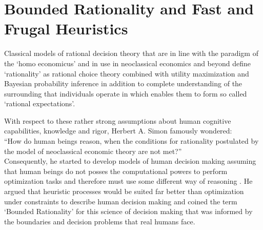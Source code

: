 \section{Bounded Rationality and Fast and Frugal Heuristics}
\label{sec:intro_bounded_rationality} 
Classical models of rational decision theory that are in line with the paradigm of the `homo economicus' and in use in neoclassical economics and beyond define `rationality' as rational choice theory combined with utility maximization and Bayesian probability inference \citep{wilkinson2012introduction} in addition to complete understanding of the surrounding that individuals operate in which enables them to form so called `rational expectations'. 

With respect to these rather strong assumptions about human cognitive capabilities, knowledge and rigor, Herbert A. Simon famously wondered: \\

``How do human beings reason, when the conditions for rationality postulated by the model of neoclassical economic theory are not met?''  \citep{simon1989scientist}\\

Consequently, he started to develop models of human decision making assuming that human beings do not posses the computational powers to perform optimization tasks and therefore must use some different way of reasoning \citep{simon1982models}. He argued that heuristic processes would be suited far better than optimization under constraints to describe human decision making and coined the term `Bounded Rationality' for this science of decision making that was informed by the boundaries and decision problems that real humans face.

